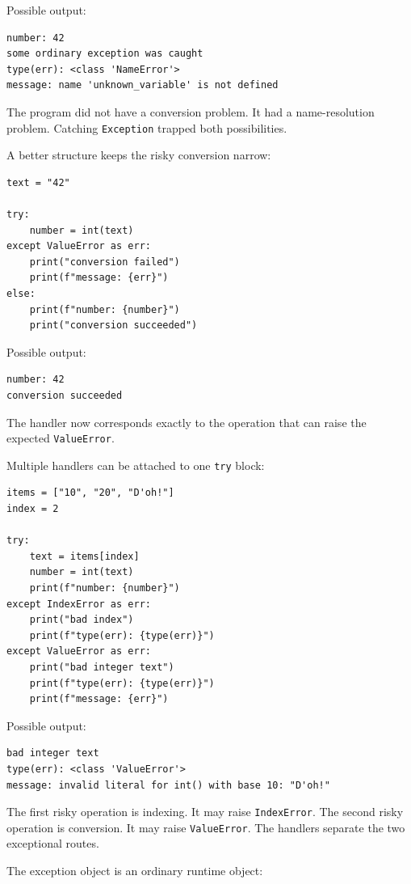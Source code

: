 Possible output:

\begin{verbatim}
number: 42
some ordinary exception was caught
type(err): <class 'NameError'>
message: name 'unknown_variable' is not defined
\end{verbatim}

The program did not have a conversion problem. It had a name-resolution problem. Catching \texttt{Exception} trapped both possibilities.

A better structure keeps the risky conversion narrow:

\begin{verbatim}
text = "42"

try:
    number = int(text)
except ValueError as err:
    print("conversion failed")
    print(f"message: {err}")
else:
    print(f"number: {number}")
    print("conversion succeeded")
\end{verbatim}

Possible output:

\begin{verbatim}
number: 42
conversion succeeded
\end{verbatim}

The handler now corresponds exactly to the operation that can raise the expected \texttt{ValueError}.

Multiple handlers can be attached to one \texttt{try} block:

\begin{verbatim}
items = ["10", "20", "D'oh!"]
index = 2

try:
    text = items[index]
    number = int(text)
    print(f"number: {number}")
except IndexError as err:
    print("bad index")
    print(f"type(err): {type(err)}")
except ValueError as err:
    print("bad integer text")
    print(f"type(err): {type(err)}")
    print(f"message: {err}")
\end{verbatim}

Possible output:

\begin{verbatim}
bad integer text
type(err): <class 'ValueError'>
message: invalid literal for int() with base 10: "D'oh!"
\end{verbatim}

The first risky operation is indexing. It may raise \texttt{IndexError}. The second risky operation is conversion. It may raise \texttt{ValueError}. The handlers separate the two exceptional routes.

The exception object is an ordinary runtime object:

